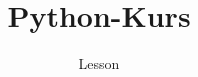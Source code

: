 \documentclass[]{tudbeamer}
\title{Python-Kurs}
\subtitle{Lesson}
\begin{document}
\maketitle

\begin{frame}
\tableofcontents
\end{frame}

\begin{comment}
\section{Sectionname}
\begin{frame}[fragile]{Sectionname} %
Write Code in the following Block
\begin{lstlisting}
\end{lstlisting}
\end{frame}	
\end{comment}
\end{document}
